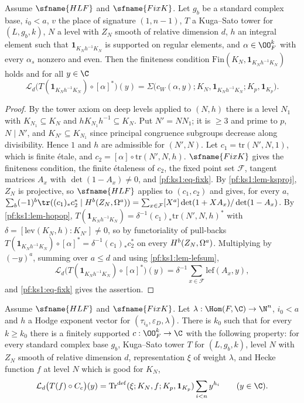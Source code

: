 \begin{proposition}\label{pf:ks1:prop-geostep}
Assume $\sfname{HLF}$ and $\sfname{FixK}$. Let $g_b$ be a standard complex base, $i_0<a$, $v$ the place of signature $(1,n-1)$, $T$ a Kuga--Sato
tower for $(L,g_b,k)$, $N$ a level with $Z_N$ smooth of relative dimension $d$, $h$ an integral element such that $\mathbf 1_{K_Nh^{-1}K_N}$ is
supported on regular elements, and $\alpha\in\OO_F^k$ with every $\alpha_s$ nonzero and even. Then the finiteness condition
$\mathrm{Fin}(K_N,\mathbf 1_{K_Nh^{-1}K_N})$ holds and for all $y\in\C$
\[\mathcal L_d\bigl(T(\mathbf 1_{K_Nh^{-1}K_N})\circ[\alpha]^*\bigr)(y)=\Sigma\bigl(c_W(\alpha,y);K_N,\mathbf 1_{K_Nh^{-1}K_N};K_p,\mathbf 1_{K_p}\bigr).\]
\end{proposition}

\begin{proof}
By the tower axiom on deep levels applied to $(N,h)$ there is a level $N_1$ with $K_{N_1}\subseteq K_N$ and $hK_{N_1}h^{-1}\subseteq K_N$. Put
$N'=NN_1$; it is $\ge3$ and prime to $p$, $N\mid N'$, and $K_{N'}\subseteq K_{N_1}$ since principal congruence subgroups decrease along
divisibility. Hence $1$ and $h$ are admissible for $(N',N)$. Let $c_1=\mathrm{tr}(N',N,1)$, which is finite \'etale, and
$c_2=[\alpha]\circ\mathrm{tr}(N',N,h)$. $\sfname{FixK}$ gives the finiteness condition, the finite \'etaleness of $c_2$, the fixed point set
$\mathcal F$, tangent matrices $A_x$ with $\det(1-A_x)\neq0$, and \eqref{pf:ks1:eq-fixk}. By \cref{pf:ks1:lem-ksproj}, $Z_N$ is projective, so
$\sfname{HLF}$ applies to $(c_1,c_2)$ and gives, for every $a$,
$\sum_b(-1)^b\tr((c_1)_*c_2^*\mid\ksoneH{Z_N}{a}{b})=\sum_{x\in\mathcal F}[X^a]\det(1+XA_x)/\det(1-A_x)$. By \cref{pf:ks1:lem-hopop},
$T(\mathbf 1_{K_Nh^{-1}K_N})=\delta^{-1}(c_1)_*\mathrm{tr}(N',N,h)^*$ with $\delta=[\mathrm{lev}(K_N,h):K_{N'}]\neq0$, so by functoriality of pull-backs
$T(\mathbf 1_{K_Nh^{-1}K_N})\circ[\alpha]^*=\delta^{-1}(c_1)_*c_2^*$ on every $\ksoneH{Z_N}{a}{b}$. Multiplying by $(-y)^a$, summing over $a\le d$ and
using \cref{pf:ks1:lem-lefsum},
\[\mathcal L_d\bigl(T(\mathbf 1_{K_Nh^{-1}K_N})\circ[\alpha]^*\bigr)(y)=\delta^{-1}\sum_{x\in\mathcal F}\mathrm{lef}(A_x,y),\]
and \eqref{pf:ks1:eq-fixk} gives the assertion.
\end{proof}

\begin{proposition}\label{pf:ks1:prop-hodgetr}
Assume $\sfname{HLF}$ and $\sfname{FixK}$. Let $\lambda:\Hom(F,\C)\to\N^n$, $i_0<a$ and $h$ a Hodge exponent vector for
$(\tau_{i_0},\varepsilon_D,\lambda)$. There is $k_0$ such that for every $k\ge k_0$ there is a finitely supported $c:\OO_F^k\to\C$ with the
following property: for every standard complex base $g_b$, Kuga--Sato tower $T$ for $(L,g_b,k)$, level $N$ with $Z_N$ smooth of relative dimension
$d$, representation $\xi$ of weight $\lambda$, and Hecke function $f$ at level $N$ which is good for $K_N$,
\[\mathcal L_d\bigl(T(f)\circ C_c\bigr)(y)=\mathrm{Tr}^{\mathrm{def}}(\xi;K_N,f;K_p,\mathbf 1_{K_p})\sum_{i<n}y^{h_i}\qquad(y\in\C).\]
\end{proposition}

